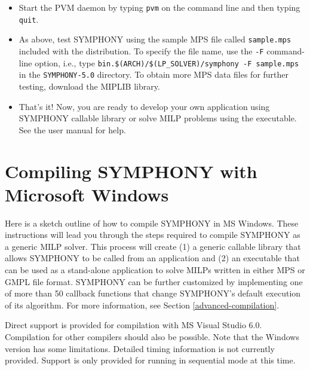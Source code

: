 \begin{itemize}
        \item Start the PVM daemon by typing {\tt pvm} on the command line
        and then typing {\tt quit}.

        \item As above, test SYMPHONY using the sample MPS file called
        \texttt{sample.mps} included with the distribution. To specify the
        file name, use the \texttt{-F} command-line option, i.e., type
        \texttt{bin.\$(ARCH)/\$(LP\_SOLVER)/symphony -F sample.mps} in the
        \texttt{SYMPHONY-5.0} directory. To obtain more MPS data files
        for further testing, download the MIPLIB library.

        \item That's it! Now, you are ready to develop your own application 
	using  SYMPHONY callable library or solve MILP problems using the 
	executable. See the user manual for help. 

\end{itemize}


\section{Compiling SYMPHONY with Microsoft Windows}
\label{getting_started_windows}

Here is a sketch outline of how to compile SYMPHONY in MS Windows. These
instructions will lead you through the steps required to compile SYMPHONY as a
generic MILP solver. This process will create (1) a generic callable library
that allows SYMPHONY to be called from an application and (2) an executable
that can be used as a stand-alone application to solve MILPs written in either
MPS or GMPL file format. SYMPHONY can be further customized by implementing
one of more than 50 callback functions that change SYMPHONY's default
execution of its algorithm. For more information, see Section
\ref{advanced-compilation}.

Direct support is provided for compilation with MS Visual Studio 6.0.
Compilation for other compilers should also be possible. Note that the Windows
version has some limitations. Detailed timing information is not currently
provided. Support is only provided for running in sequential mode at this
time.

